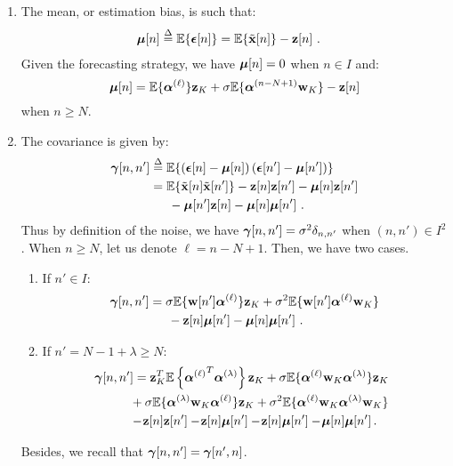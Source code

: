 \begin{enumerate}
\item 
The mean, or estimation bias, is such that: 
\begin{align*}
\boldsymbol{\mu}[n]&\overset{\Delta}{=}{\mathbb E}\{\boldsymbol{\epsilon}[n]\} 
={\mathbb E}\{\tilde{{\mathbf x}}[n]\} - {\mathbf z}[n]\ .
\end{align*}
Given the forecasting strategy, we have $\boldsymbol{\mu}[n]=0$ when $n\in I$ and: 
\begin{equation}
\bmu[n]= \EE\{\balpha^{(\ell)}\}\bz_{K} + \sigma\EE\{\balpha^{(n-N+1)}\bw_{K}\} - \bz[n]
\label{eq:bias0}
\end{equation}
when $n\geq N$.
\item 
The covariance is given by:
\begin{align*}
\boldsymbol{\gamma}[n,n'] &\overset{\Delta}{=} {\mathbb E}\{\left(\boldsymbol{\epsilon}[n]-\boldsymbol{\mu}[n]\right)\left(\boldsymbol{\epsilon}[n']-\boldsymbol{\mu}[n']\right)\}\\
&= {\mathbb E}\{\tilde{{\mathbf x}}[n]\tilde{{\mathbf x}}[n']\}-{\mathbf z}[n]{\mathbf z}[n'] -\boldsymbol{\mu}[n]{\mathbf z}[n'] \\
&\hspace{15pt} - \boldsymbol{\mu}[n']{\mathbf z}[n] -\boldsymbol{\mu}[n]\boldsymbol{\mu}[n']\ .
\end{align*}
Thus by definition of the noise, we have $\boldsymbol{\gamma}[n,n'] =\sigma^2\delta_{n,n'}$ when $(n,n')\in I^2$. When $n\geq N$, let us denote $\ell=n-N+1$. Then, we have two cases.
\begin{enumerate}[label=(\roman*)]
\item If $n'\in I$:
\begin{align}
\nonumber
\bgamma[n,n'] &= \sigma\EE\{\bw[n']\balpha^{(\ell)}\}\bz_K + \sigma^2\EE\{\bw[n']\balpha^{(\ell)}\bw_K\} \\
&\hspace{15pt} -\bz[n]\bmu[n'] - \bmu[n]\bmu[n']\ .
\label{eq:cov00}
\end{align}
\item If $n'=N-1+\lambda\geq N$:
\begin{align}
\nonumber
\hspace{-6pt}\bgamma[n,n'] &= \bz_K^T\EE\left\{{\balpha^{(\ell)}}^T\balpha^{(\lambda)}\right\}\bz_K + \sigma\EE\{\balpha^{(\ell)}\bw_K\balpha^{(\lambda)}\}\bz_K \\
\nonumber
&\hspace{-3pt} + \sigma\EE\{\balpha^{(\lambda)}\bw_K\balpha^{(\ell)}\}\bz_K + \sigma^2\EE\{\balpha^{(\ell)}\bw_K\balpha^{(\lambda)}\bw_K\}  \\
&\hspace{-3pt} -\!\bz[n]\bz[n']-\!\bz[n]\bmu[n']-\!\bz[n]\bmu[n'] -\! \bmu[n]\bmu[n']\,.
\label{eq:cov01}
\end{align}
\end{enumerate}
Besides, we recall that $\boldsymbol{\gamma}[n,n']=\boldsymbol{\gamma}[n',n]$.
\end{enumerate}

